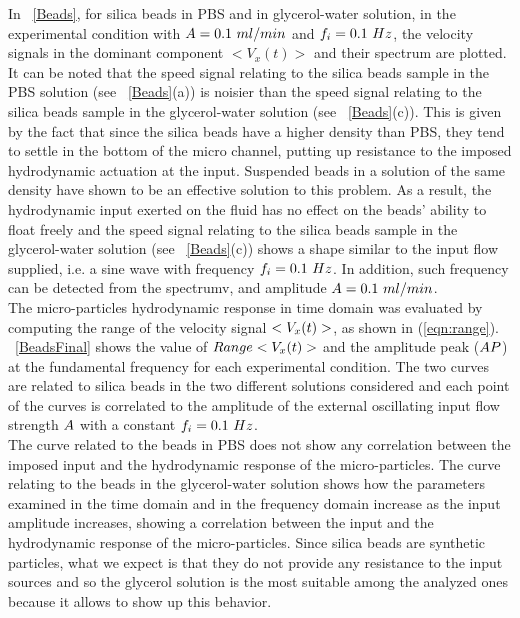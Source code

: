 \documentclass[journal]{IEEEtran}
\theoremstyle{definition}
\theoremstyle{remark}
\begin{document}
In ~\fig\ref{Beads}, for silica beads in PBS and in glycerol-water solution, in the experimental condition with $A=0.1~ml/min$ and  $f_i=0.1~Hz$, the velocity signals in the dominant component  $<V_x(t)>$ and their spectrum are plotted.
It can be noted that the speed signal relating to the silica beads sample in the PBS solution (see ~\fig\ref{Beads}(a)) is noisier than the speed signal relating to the silica beads sample in the glycerol-water solution (see ~\fig\ref{Beads}(c)). This is given by the fact that since the silica beads have a higher density than PBS, they tend to settle in the bottom of the micro channel, putting up resistance to the imposed hydrodynamic actuation at the input. Suspended beads in a solution of the same density have shown to be an effective solution to this problem. As a result, the hydrodynamic input exerted on the fluid has no effect on the beads' ability to float freely and the speed signal relating to the silica beads sample in the glycerol-water solution (see ~\fig\ref{Beads}(c)) shows a shape similar to the input flow supplied, i.e. a sine wave with frequency $f_i=0.1~Hz$. In addition, such frequency can be detected from the spectrumv, and amplitude $A=0.1~ml/min$.
\\The micro-particles hydrodynamic response in time domain was evaluated by computing the range of the velocity signal $<V_{x}(t)>$, as shown in \eqn (\ref{eqn:range}). ~\fig\ref{BeadsFinal} shows the value of $Range<V_x(t)>$ and the amplitude peak ($AP$) at the fundamental frequency for each experimental condition. The two curves are related to silica beads in the two different solutions considered and each point of the curves is correlated to the amplitude of the external oscillating input flow strength $A$ with a constant $f_i=0.1~Hz$. 
\\The curve related to the beads in PBS does not show any correlation between the imposed input and the hydrodynamic response of the micro-particles. The curve relating to the beads in the glycerol-water solution shows how the parameters examined in the time domain and in the frequency domain increase as the input amplitude increases, showing a correlation between the input and the hydrodynamic response of the micro-particles.
Since silica beads are synthetic particles, what we expect is that they do not provide any resistance to the input sources and so the glycerol solution is the most suitable among the analyzed ones because it allows to show up this behavior.
\end{document}
